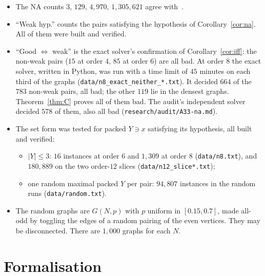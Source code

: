 \documentclass[11pt]{amsart}
\theoremstyle{definition}
\begin{document}
\begin{itemize}
\item The NA counts $3$, $129$, $4{,}970$, $1{,}305{,}621$ agree with~\cite[\S5]{CN}.
\item ``Weak hyp.'' counts the pairs satisfying the hypothesis of Corollary~\ref{cor:na}. All of them
were built and verified.
\item ``Good $\Leftrightarrow$ weak'' is the exact solver's confirmation of Corollary~\ref{cor:iff}: the
non-weak pairs ($15$ at order $4$, $85$ at order $6$) are all bad. At order $8$ the exact solver,
written in Python, was run with a time limit of $45$ minutes on each third of the graphs
(\texttt{data/n8\_exact\_neither\_*.txt}). It decided $664$ of the $783$ non-weak pairs, all bad; the
other $119$ lie in the densest graphs. Theorem~\ref{thm:C} proves all of them bad. The audit's
independent solver decided $578$ of them, also all bad (\texttt{research/audit/A33-na.md}).
\item The set form was tested for packed $Y\ni x$ satisfying its hypothesis, all built and verified:
  \begin{itemize}
  \item $|Y|\le3$: $16$ instances at order $6$ and $1{,}309$ at order $8$ (\texttt{data/n8.txt}), and
  $180{,}889$ on the two order-$12$ slices (\texttt{data/n12\_slice*.txt});
  \item one random maximal packed $Y$ per pair: $94{,}807$ instances in the random runs
  (\texttt{data/random.txt}).
  \end{itemize}
\item The random graphs are $G(N,p)$ with $p$ uniform in $[0.15,0.7]$, made all-odd by toggling the
edges of a random pairing of the even vertices. They may be disconnected. There are $1{,}000$ graphs
for each $N$.
\end{itemize}

\section{Formalisation}\label{sec:lean}
\end{document}
